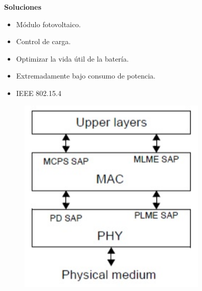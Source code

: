 \documentclass[aspectratio=43, handout]{beamer}
\begin{document}
\begin{frame}{\textbf{\LARGE{Soluciones}}}
\fontsize{15pt}{15}\selectfont
\begin{minipage}[c]{1.0\linewidth}
	\begin{minipage}[c]{0.55\linewidth}
		\begin{itemize}
			\item Módulo fotovoltaico.
					\vspace{10px}
			\item Control de carga.
					\vspace{10px}
			\item Optimizar la vida útil de la batería.
					\vspace{10px}
			\item Extremadamente bajo consumo de potencia.
		\end{itemize}
		\end{minipage}
	\begin{minipage}[c]{0.4\linewidth}
		\begin{itemize}
			\item IEEE 802.15.4
		\end{itemize}		
		\begin{figure}[H]
			{\includegraphics[width=0.8\textwidth]{./imagenes/arquitectura}}
		\end{figure}	
	\end{minipage}
\end{minipage}
\end{frame}
\end{document}
